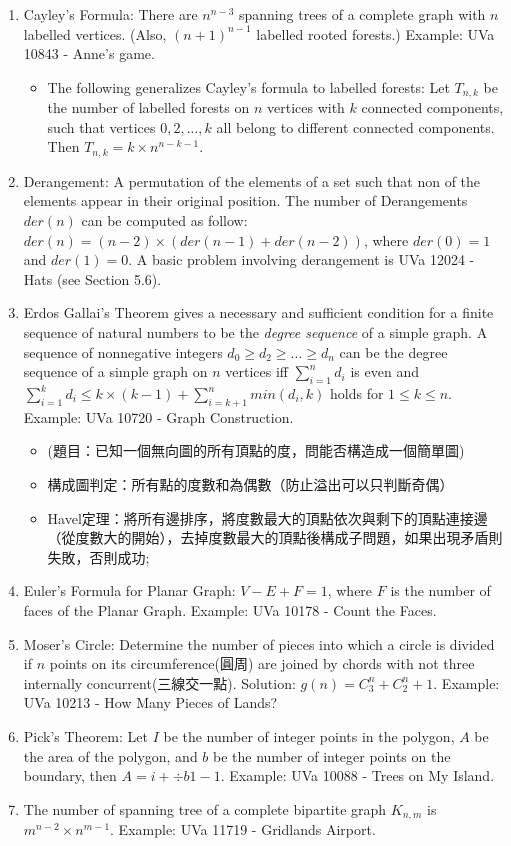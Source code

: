 
\begin{enumerate}
\item Cayley's Formula: There are $n^{n-3}$ spanning trees of a complete graph with $n$ labelled vertices. (Also, $(n+1)^{n-1}$ labelled rooted forests.) Example: UVa 10843 - Anne's game.
	\begin{itemize}
		\item The following generalizes Cayley's formula to labelled forests: Let $T_{n,k}$ be the number of labelled forests on $n$ vertices with $k$ connected components, such that vertices $0, 2, ..., k$ all belong to different connected components. Then $T_{n,k} = k\times n^{n − k − 1}$.
	\end{itemize}
\item Derangement: A permutation of the elements of a set such that non of the elements appear in their original position. The number of Derangements $der(n)$ can be computed as follow: $der(n) = (n-2) \times (der(n-1) + der(n-2))$, where $der(0) = 1$ and $der(1) = 0$. A basic problem involving derangement is UVa 12024 - Hats (see Section 5.6).
\item  Erdos Gallai's Theorem gives a necessary and sufficient condition for a finite sequence of natural numbers to be the \emph{degree sequence} of a simple graph. A sequence of nonnegative integers $d_0 \geq d_2 \geq ... \geq d_n$ can be the degree sequence of a simple graph on $n$ vertices iff $\sum_{i=1}^{n} d_i$ is even and $\sum_{i=1}^{k} d_i \leq k \times (k-1) + \sum_{i=k+1}^{n}min(d_i, k)$ holds for $1 \leq k \leq n$. Example: UVa 10720 - Graph Construction.
	\begin{itemize}
	\item (題目：已知一個無向圖的所有頂點的度，問能否構造成一個簡單圖)
	\item 構成圖判定：所有點的度數和為偶數（防止溢出可以只判斷奇偶）
	\item Havel定理：將所有邊排序，將度數最大的頂點依次與剩下的頂點連接邊（從度數大的開始），去掉度數最大的頂點後構成子問題，如果出現矛盾則失敗，否則成功;
	\end{itemize}
\item Euler's Formula for Planar Graph: $V-E+F=1$, where $F$ is the number of faces of the Planar Graph. Example: UVa 10178 - Count the Faces.
\item Moser's Circle: Determine the number of pieces into which a circle is divided if $n$ points on its circumference(圓周) are joined by chords with not three internally concurrent(三線交一點). Solution: $g(n) = C_{3}^{n} + C_{2}^{n} + 1$. Example: UVa 10213 - How Many Pieces of Lands?
\item Pick's Theorem: Let $I$ be the number of integer points in the polygon, $A$ be the area of the polygon, and $b$ be the number of integer points on the boundary, then $A = i + \div{b}{1} - 1$. Example: UVa 10088 - Trees on My Island.
\item The number of spanning tree of a complete bipartite graph $K_{n,m}$ is $m^{n-2} \times n^{m-1}$. Example: UVa 11719 - Gridlands Airport.
	
\end{enumerate}